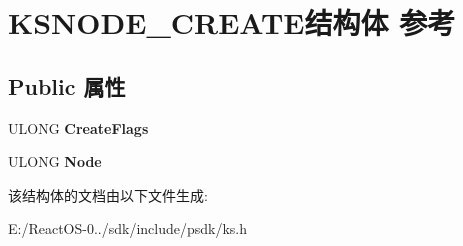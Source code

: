 \hypertarget{struct_k_s_n_o_d_e___c_r_e_a_t_e}{}\section{K\+S\+N\+O\+D\+E\+\_\+\+C\+R\+E\+A\+T\+E结构体 参考}
\label{struct_k_s_n_o_d_e___c_r_e_a_t_e}
\subsection*{Public 属性}
\begin{DoxyCompactItemize}
\item 
\mbox{\label{struct_k_s_n_o_d_e___c_r_e_a_t_e_a19a75f781b3040a080fa5ea0b1e5d1bb}} 
U\+L\+O\+NG {\bfseries Create\+Flags}
\item 
\mbox{\label{struct_k_s_n_o_d_e___c_r_e_a_t_e_a197de82f5566cd0d2d7d84e6fefaa1f4}} 
U\+L\+O\+NG {\bfseries Node}
\end{DoxyCompactItemize}


该结构体的文档由以下文件生成\+:\begin{DoxyCompactItemize}
\item 
E\+:/\+React\+O\+S-\/0../sdk/include/psdk/ks.\+h\end{DoxyCompactItemize}
